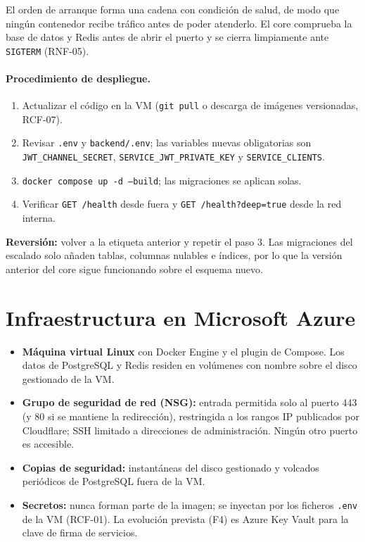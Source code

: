 \documentclass[11pt,a4paper]{report}
\begin{document}
El orden de arranque forma una cadena con condición de salud, de modo que ningún contenedor recibe tráfico antes de poder atenderlo. El core comprueba la base de datos y Redis antes de abrir el puerto y se cierra limpiamente ante \texttt{SIGTERM} (RNF-05).

\paragraph{Procedimiento de despliegue.}
\begin{enumerate}[leftmargin=*,itemsep=0pt]
\item Actualizar el código en la VM (\texttt{git pull} o descarga de imágenes versionadas, RCF-07).
\item Revisar \texttt{.env} y \texttt{backend/.env}; las variables nuevas obligatorias son \texttt{JWT\_CHANNEL\_SECRET}, \texttt{SERVICE\_JWT\_PRIVATE\_KEY} y \texttt{SERVICE\_CLIENTS}.
\item \texttt{docker compose up -d --build}; las migraciones se aplican solas.
\item Verificar \texttt{GET /health} desde fuera y \texttt{GET /health?deep=true} desde la red interna.
\end{enumerate}
\textbf{Reversión:} volver a la etiqueta anterior y repetir el paso 3. Las migraciones del escalado solo añaden tablas, columnas nulables e índices, por lo que la versión anterior del core sigue funcionando sobre el esquema nuevo.

\section{Infraestructura en Microsoft Azure}
\begin{itemize}[leftmargin=*,itemsep=2pt]
\item \textbf{Máquina virtual Linux} con Docker Engine y el plugin de Compose. Los datos de PostgreSQL y Redis residen en volúmenes con nombre sobre el disco gestionado de la VM.
\item \textbf{Grupo de seguridad de red (NSG):} entrada permitida solo al puerto 443 (y 80 si se mantiene la redirección), restringida a los rangos IP publicados por Cloudflare; SSH limitado a direcciones de administración. Ningún otro puerto es accesible.
\item \textbf{Copias de seguridad:} instantáneas del disco gestionado y volcados periódicos de PostgreSQL fuera de la VM.
\item \textbf{Secretos:} nunca forman parte de la imagen; se inyectan por los ficheros \texttt{.env} de la VM (RCF-01). La evolución prevista (F4) es Azure Key Vault para la clave de firma de servicios.
\end{itemize}
\end{document}
